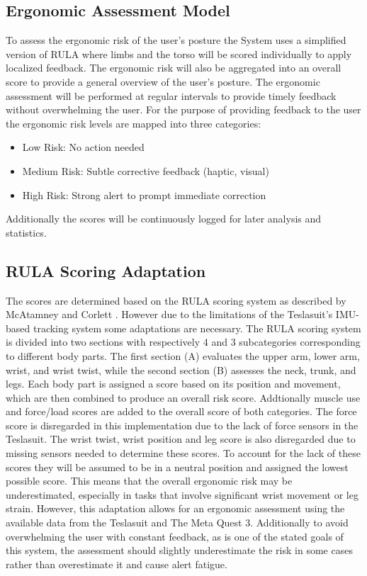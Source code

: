 \subsection{Ergonomic Assessment Model}
To assess the ergonomic risk of the user's posture the System uses a simplified version of RULA where limbs and the torso will be scored individually to apply localized feedback. The ergonomic risk will also be aggregated into an overall score to provide a general overview of the user's posture. The ergonomic assessment will be performed at regular intervals to provide timely feedback without overwhelming the user.
For the purpose of providing feedback to the user the ergonomic risk levels are mapped into three categories:
\begin{itemize}
    \item Low Risk: No action needed
    \item Medium Risk: Subtle corrective feedback (haptic, visual)
    \item High Risk: Strong alert to prompt immediate correction
\end{itemize}
Additionally the scores will be continuously logged for later analysis and statistics. 
\subsection{RULA Scoring Adaptation}
The scores are determined based on the RULA scoring system as described by McAtamney and Corlett \cite{mcatamney1993rula}. However due to the limitations of the Teslasuit's IMU-based tracking system some adaptations are necessary. 
The RULA scoring system is divided into two sections with respectively 4 and 3 subcategories corresponding to different body parts. The first section (A) evaluates the upper arm, lower arm, wrist, and wrist twist, while the second section (B) assesses the neck, trunk, and legs. Each body part is assigned a score based on its position and movement, which are then combined to produce an overall risk score. Addtionally muscle use and force/load scores are added to the overall score of both categories. The force score is disregarded in this implementation due to the lack of force sensors in the Teslasuit.
The wrist twist, wrist position and leg score is also disregarded due to missing sensors needed to determine these scores.
To account for the lack of these scores they will be assumed to be in a neutral position and assigned the lowest possible score. This means that the overall ergonomic risk may be underestimated, especially in tasks that involve significant wrist movement or leg strain. However, this adaptation allows for an ergonomic assessment using the available data from the Teslasuit and The Meta Quest 3. Additionally to avoid overwhelming the user with constant feedback, as is one of the stated goals of this system, the assessment should slightly underestimate the risk in some cases rather than overestimate it and cause alert fatigue. 

